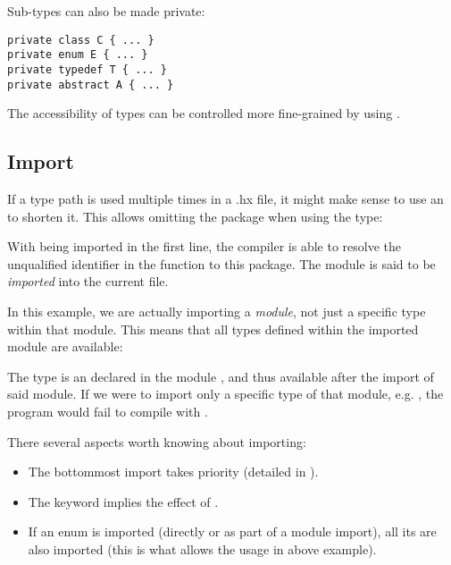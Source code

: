 Sub-types can also be made private:

\begin{lstlisting}
private class C { ... }
private enum E { ... }
private typedef T { ... }
private abstract A { ... }
\end{lstlisting}


The accessibility of types can be controlled more fine-grained by using .



\subsection{Import}
\label{type-system-import}

If a type path is used multiple times in a .hx file, it might make sense to use an  to shorten it. This allows omitting the package when using the type:


With  being imported in the first line, the compiler is able to resolve the unqualified identifier  in the  function to this package. The module  is said to be \emph{imported} into the current file.

In this example, we are actually importing a \emph{module}, not just a specific type within that module. This means that all types defined within the imported module are available:


The type  is an  declared in the module , and thus available after the import of said module. If we were to import only a specific type of that module, e.g. , the program would fail to compile with .

There several aspects worth knowing about importing:

\begin{itemize}
	\item The bottommost import takes priority (detailed in ).
	\item The  keyword  implies the effect of .
	\item If an enum is imported (directly or as part of a module import), all its  are also imported (this is what allows the  usage in above example).
\end{itemize}


